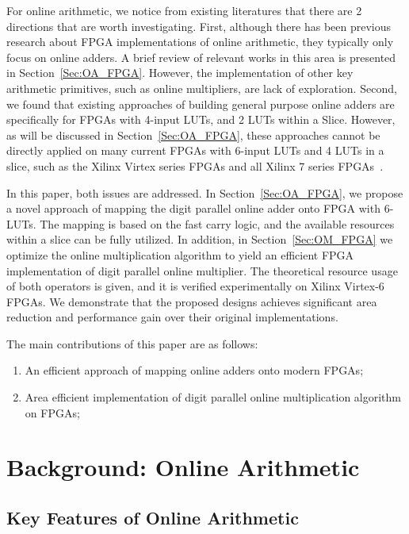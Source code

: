 \documentclass[conference]{IEEEtran}
\begin{document}
For online arithmetic, we notice from existing literatures that there are 2 directions that are worth investigating. First, although there has been previous research about FPGA implementations of online arithmetic, they typically only focus on online adders. A brief review of relevant works in this area is presented in Section~\ref{Sec:OA_FPGA}. However, the implementation of other key arithmetic primitives, such as online multipliers, are lack of exploration. Second, we found that existing approaches of building general purpose online adders are specifically for FPGAs with 4-input LUTs, and 2 LUTs within a Slice. However, as will be discussed in Section~\ref{Sec:OA_FPGA}, these approaches cannot be directly applied on many current FPGAs with 6-input LUTs and 4 LUTs in a slice, such as the Xilinx Virtex series FPGAs and all Xilinx 7 series FPGAs~\cite{Virtex7}.

In this paper, both issues are addressed. In Section~\ref{Sec:OA_FPGA}, we propose a novel approach of mapping the digit parallel online adder onto FPGA with 6-LUTs. The mapping is based on the fast carry logic, and the available resources within a slice can be fully utilized. In addition, in Section~\ref{Sec:OM_FPGA} we optimize the online multiplication algorithm to yield an efficient FPGA implementation of digit parallel online multiplier. The theoretical resource usage of both operators is given, and it is verified experimentally on Xilinx Virtex-6 FPGAs. We demonstrate that the proposed designs achieves significant area reduction and performance gain over their original implementations.

The main contributions of this paper are as follows:
\begin{enumerate}
    \item An efficient approach of mapping online adders onto modern FPGAs;
    \item Area efficient implementation of digit parallel online multiplication algorithm on FPGAs;
\end{enumerate}



\section{Background: Online Arithmetic}\label{Sec:Background}
\subsection{Key Features of Online Arithmetic}
\end{document}

